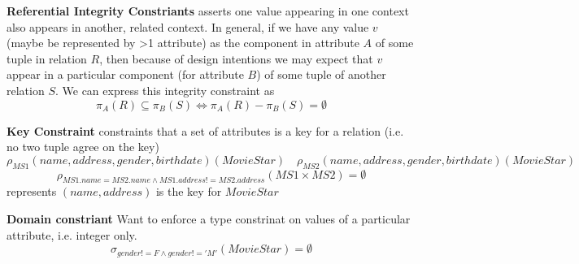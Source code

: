 \documentclass[11pt]{article}
\begin{document}
\begin{defn*}
    \textbf{Referential Integrity Constriants} asserts one value appearing in one context also appears in another, related context. In general, if we have any value $v$ (maybe be represented by >1 attribute) as the component in attribute $A$ of some tuple in relation $R$, then because of design intentions we may expect that $v$ appear in a particular component (for attribute $B$) of some tuple of another relation $S$. We can express this integrity constraint as 
    \[
        \pi_A (R) \subseteq \pi_B (S) \iff \pi_A(R) - \pi_B(S) = \emptyset
    \]
\end{defn*}


\begin{defn*}
    \textbf{Key Constraint} constraints that a set of attributes is a key for a relation (i.e. no two tuple agree on the key) 
    \[
        \rho_{MS1}(name, address, gender, birthdate)(MovieStar) \quad \rho_{MS2}(name, address, gender, birthdate)(MovieStar)
    \]
    \[
        \rho_{MS1.name=MS2.name \land MS1.address!=MS2.address}(MS1 \times MS2) = \emptyset
    \]
    represents $(name, address)$ is the key for $MovieStar$
\end{defn*}

\begin{defn*}
    \textbf{Domain constriant}
    Want to enforce a type constrinat on values of a particular attribute, i.e. integer only.
    \[
        \sigma_{gender!=F \land gender!='M'}(MovieStar) = \emptyset
    \]
\end{defn*}
\end{document}
